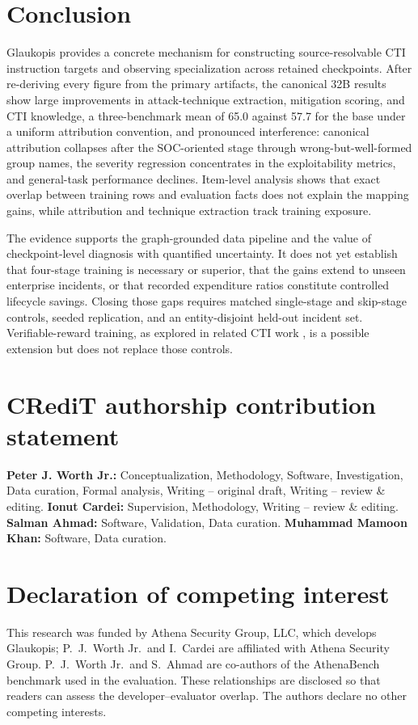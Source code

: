 \documentclass[preprint,12pt,authoryear]{elsarticle}
\begin{document}
\section{Conclusion}\label{sec:conclusion}
Glaukopis provides a concrete mechanism for constructing source-resolvable CTI instruction targets and observing specialization across retained checkpoints. After re-deriving every figure from the primary artifacts, the canonical 32B results show large improvements in attack-technique extraction, mitigation scoring, and CTI knowledge, a three-benchmark mean of 65.0 against 57.7 for the base under a uniform attribution convention, and pronounced interference: canonical attribution collapses after the SOC-oriented stage through wrong-but-well-formed group names, the severity regression concentrates in the exploitability metrics, and general-task performance declines. Item-level analysis shows that exact overlap between training rows and evaluation facts does not explain the mapping gains, while attribution and technique extraction track training exposure.

The evidence supports the graph-grounded data pipeline and the value of checkpoint-level diagnosis with quantified uncertainty. It does not yet establish that four-stage training is necessary or superior, that the gains extend to unseen enterprise incidents, or that recorded expenditure ratios constitute controlled lifecycle savings. Closing those gaps requires matched single-stage and skip-stage controls, seeded replication, and an entity-disjoint held-out incident set. Verifiable-reward training, as explored in related CTI work \citep{alam2026minerva}, is a possible extension but does not replace those controls.

\section*{CRediT authorship contribution statement}
\textbf{Peter J. Worth Jr.:} Conceptualization, Methodology, Software, Investigation, Data curation, Formal analysis, Writing -- original draft, Writing -- review \& editing. \textbf{Ionut Cardei:} Supervision, Methodology, Writing -- review \& editing. \textbf{Salman Ahmad:} Software, Validation, Data curation. \textbf{Muhammad Mamoon Khan:} Software, Data curation.

\section*{Declaration of competing interest}
This research was funded by Athena Security Group, LLC, which develops Glaukopis; P.~J.~Worth Jr.\ and I.~Cardei are affiliated with Athena Security Group. P.~J.~Worth Jr.\ and S.~Ahmad are co-authors of the AthenaBench benchmark used in the evaluation. These relationships are disclosed so that readers can assess the developer--evaluator overlap. The authors declare no other competing interests.
\end{document}
